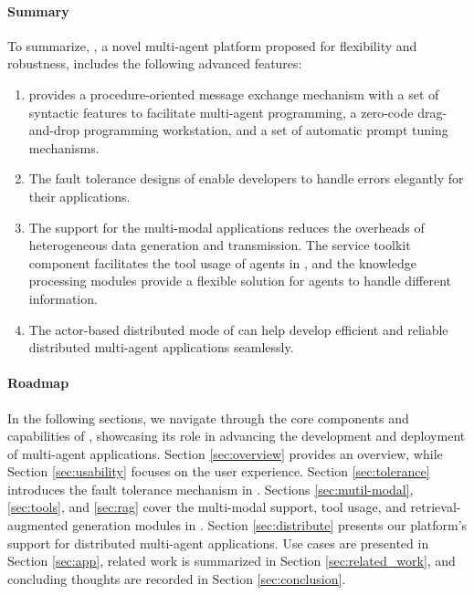 \noindent
\paragraph{Summary}
To summarize, \ours, a novel multi-agent platform proposed for flexibility and robustness, includes the following advanced features:
\begin{enumerate}
    \item 
    \ours provides a procedure-oriented message exchange mechanism with a set of syntactic features to facilitate multi-agent programming, a zero-code drag-and-drop programming workstation, and a set of automatic prompt tuning mechanisms.
    
    \item 
    The fault tolerance designs of \ours enable developers to handle errors elegantly for their applications.
    
    \item 
    The support for the multi-modal applications reduces the overheads of heterogeneous data generation and transmission. The service toolkit component facilitates the tool usage of agents in \ours, and the knowledge processing modules provide a flexible solution for agents to handle different information.
    
    \item
    The actor-based distributed mode of \ours can help develop efficient and reliable distributed multi-agent applications seamlessly.
\end{enumerate}

\noindent\paragraph{Roadmap}
In the following sections, we navigate through the core components and capabilities of \ours, showcasing its role in advancing the development and deployment of multi-agent applications. Section \ref{sec:overview} provides an overview, while Section \ref{sec:usability} focuses on the user experience.
Section \ref{sec:tolerance} introduces the fault tolerance mechanism in \ours.
Sections \ref{sec:mutil-modal}, \ref{sec:tools}, and \ref{sec:rag} cover the multi-modal support, tool usage, and retrieval-augmented generation modules in \ours. 
Section \ref{sec:distribute} presents our platform's support for distributed multi-agent applications.
Use cases are presented in Section \ref{sec:app}, related work is summarized in Section \ref{sec:related_work}, and concluding thoughts are recorded in Section \ref{sec:conclusion}.
